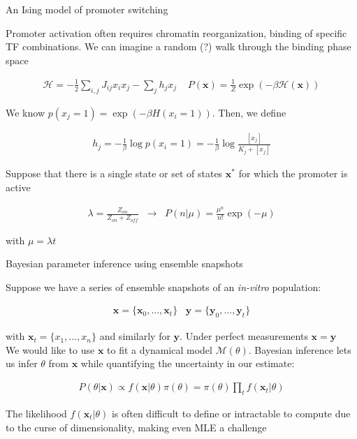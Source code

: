 \documentclass[aspectratio=1610]{beamer}					%
\begin{document}
\begin{frame}{An Ising model of promoter switching}

Promoter activation often requires chromatin reorganization, binding of specific TF combinations. We can imagine a random (?) walk through the binding phase space

\begin{align*}
\mathcal{H} = -\frac{1}{2}\sum_{i,j}J_{ij}x_{i}x_{j} - \sum_{j}h_{j}x_{j}\;\;\;\; P(\bm{x}) = \frac{1}{Z}\exp\left(-\beta \mathcal{H}(\bm{x})\right)
\end{align*}

We know $p(x_{j}=1) = \exp(-\beta H(x_{i}=1))$. Then, we define 

\begin{align*}
h_{j} = -\frac{1}{\beta}\log p(x_{i}=1) = -\frac{1}{\beta}\log \frac{[x_{j}]}{K_{j} + [x_{j}]}
\end{align*}

Suppose that there is a single state or set of states $\bm{x}^{*}$ for which the promoter is active

\begin{align*}
\lambda = \frac{Z_{on}}{Z_{on}+Z_{off}} \;\;\rightarrow\;\; P(n|\mu) = \frac{\mu^{n}}{n!}\exp(-\mu)
\end{align*}

with $\mu=\lambda t$

\end{frame}

\begin{frame}{Bayesian parameter inference using ensemble snapshots}

Suppose we have a series of ensemble snapshots of an \emph{in-vitro} population:

\begin{align*}
\mathbf{x} = \{\mathbf{x}_{0}, ..., \mathbf{x}_{t}\}\;\;\; \mathbf{y} = \{\mathbf{y}_{0}, ..., \mathbf{y}_{t}\}
\end{align*}

with $\mathbf{x}_{t} = \{x_{1}, ..., x_{n}\}$ and similarly for $\mathbf{y}$. Under perfect measurements $\mathbf{x}=\mathbf{y}$\\
\vspace{0.2in}
We would like to use $\mathbf{x}$ to fit a dynamical model $\mathcal{M}(\theta)$. Bayesian inference lets us infer $\theta$ from $\mathbf{x}$ while quantifying the uncertainty in our estimate:

\begin{align*}
P(\theta|\mathbf{x}) \propto f(\mathbf{x}|\theta)\pi(\theta) = \pi(\theta)\prod_{t} f(\mathbf{x}_{t}|\theta)
\end{align*}

The likelihood $f(\mathbf{x}_{t}|\theta)$ is often difficult to define or intractable to compute due to the curse of dimensionality, making even MLE a challenge

\end{frame}
\end{document}

